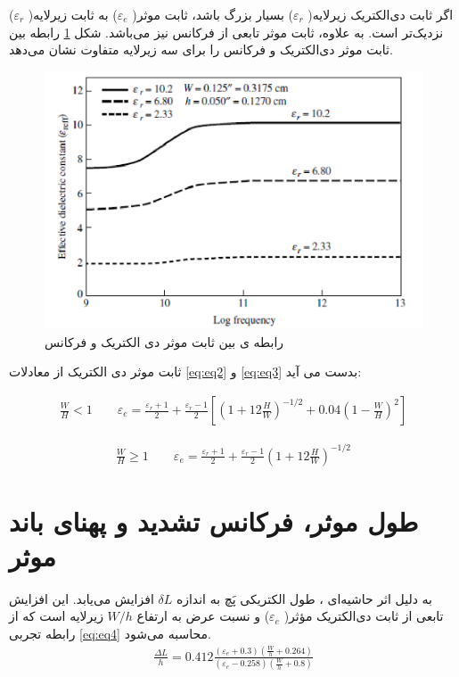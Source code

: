 اگر ثابت دی‌الکتریک زیرلایه(
$\varepsilon_r$)
بسیار بزرگ باشد، ثابت موثر(
$\varepsilon_{e}$)
به ثابت زیرلایه(
$\varepsilon_{r}$)
نزدیک‌تر است. به علاوه، ثابت موثر تابعی از فرکانس نیز می‌باشد. شکل 
\ref{fig9}
 رابطه بین ثابت موثر دی‌الکتریک و فرکانس را برای سه زیرلایه متفاوت نشان می‌دهد.

\begin{figure}
	\centering
	\includegraphics[scale=0.3]{Images/fig9.png}
	\caption{رابطه ی بین ثابت موثر دی الکتریک و فرکانس}
	\label{fig9}
\end{figure}

ثابت موثر دی الکتریک از معادلات 
\ref{eq:eq2}
و
\ref{eq:eq3}
بدست می آید:

\begin{align}
 	\label{eq:eq2}
    \frac{W}{H} < 1	\qquad  \varepsilon_e = \frac{\varepsilon_r+1}{2} + \frac{\varepsilon_r-1}{2} \left[ \left(1+12\frac{H}{W}\right)^{-1/2} + 0.04 \left(1-\frac{W}{H}\right)^2 \right]
\end{align}


\begin{align}
	\label{eq:eq3}
    \frac{W}{H} \geq 1 \qquad \varepsilon_e = \frac{\varepsilon_r+1}{2} + \frac{\varepsilon_r-1}{2} \left(1+12\frac{H}{W}\right)^{-1/2} 
\end{align}


\section{طول موثر، فرکانس تشدید و پهنای باند موثر}
به دلیل اثر حاشیه‌ای
،
 طول الکتریکی پَچ به اندازه
$ \delta L$
 افزایش می‌یابد. این افزایش تابعی از ثابت دی‌الکتریک مؤثر(
 $\varepsilon_{e}$)
 و نسبت عرض به ارتفاع
 $W/h$
  زیرلایه است که از رابطه تجربی 
\eqref{eq:eq4}
   محاسبه می‌شود.
\begin{align}
	\label{eq:eq4}
	\frac{\Delta L}{h} = 0.412 \frac{(\varepsilon_{e}+0.3)\left(\frac{W}{h}+0.264\right)}{(\varepsilon_{e}-0.258)\left(\frac{W}{h}+0.8\right)}
\end{align}


